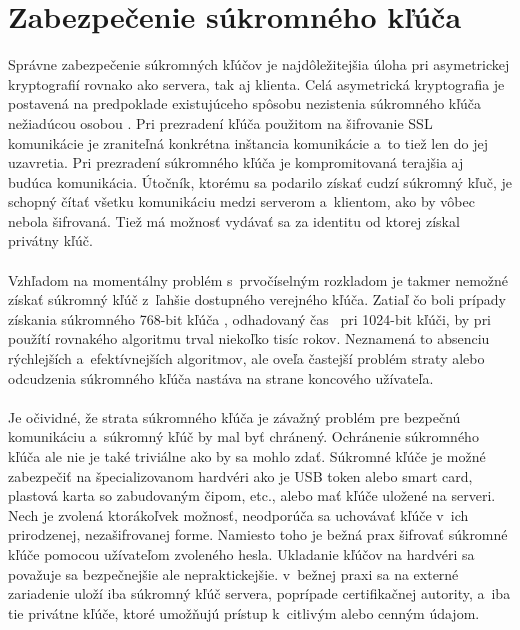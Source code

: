 \documentclass[
  digital, %
  table,   %
oneside,
  nolof,     %
  nolot,     %
]{fithesis3}
\begin{document}
\section{Zabezpečenie súkromného kľúča }
Správne zabezpečenie súkromných kľúčov je najdôležitejšia úloha pri asymetrickej kryptografií rovnako ako servera, tak aj klienta. Celá asymetrická kryptografia je postavená na predpoklade existujúceho spôsobu nezistenia súkromného kľúča nežiadúcou osobou \cite{ssl}. Pri prezradení kľúča použitom na šifrovanie SSL komunikácie je zraniteľná konkrétna inštancia komunikácie a~to tiež len do jej uzavretia. Pri prezradení súkromného kľúča je kompromitovaná terajšia aj budúca komunikácia. Útočník, ktorému sa podarilo získať cudzí súkromný kľuč, je schopný čítať všetku komunikáciu medzi serverom a~klientom, ako by vôbec nebola šifrovaná. Tiež má možnosť vydávať sa za identitu od ktorej získal privátny kľúč.\paragraph{}
Vzhľadom na momentálny problém s~prvočíselným rozkladom je takmer nemožné získať súkromný kľúč z~ľahšie dostupného verejného kľúča. Zatiaľ čo boli prípady získania súkromného 768-bit kľúča \cite{crypt768}, odhadovaný čas~ pri 1024-bit kľúči, by pri  použítí rovnakého algoritmu trval niekoľko tisíc rokov. Neznamená to absenciu rýchlejších a~efektívnejších algoritmov, ale oveľa častejší problém straty alebo odcudzenia súkromného kľúča nastáva na strane koncového užívateľa.\paragraph{}
Je očividné, že strata súkromného kľúča je závažný problém pre bezpečnú komunikáciu a~súkromný kľúč by mal byť chránený. Ochránenie súkromného kľúča ale nie je také triviálne ako by sa mohlo zdať. Súkromné kľúče je možné zabezpečiť na špecializovanom hardvéri ako je USB token alebo smart card, plastová karta so zabudovaným čipom, etc., alebo mať kľúče uložené na serveri. Nech je zvolená ktorákoľvek možnosť, neodporúča sa  uchovávať kľúče v~ich prirodzenej, nezašifrovanej forme. Namiesto toho je bežná prax šifrovať súkromné kľúče pomocou užívateľom zvoleného hesla. Ukladanie kľúčov na hardvéri sa považuje sa bezpečnejšie ale nepraktickejšie. v~bežnej praxi sa na externé zariadenie uloží iba súkromný kľúč servera, poprípade certifikačnej autority, a~iba tie privátne kľúče, ktoré umožňujú prístup k~citlivým alebo cenným údajom. \paragraph{}
\end{document}
